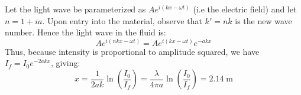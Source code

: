 \begin{solution}Let the light wave be parameterized as $Ae^{i(kx - \omega t)}$ (i.e the electric field) and let $n = 1 + ia$. Upon entry into the material, observe that $k' = nk$ is the new wave number. Hence the light wave in the fluid is:
$$Ae^{i(nkx - \omega t)} = Ae^{i(kx- \omega t)}e^{-akx}$$
Thus, because intensity is proportional to amplitude squared, we have $I_f = I_0 e^{-2akx}$, giving:
$$x = \frac{1}{2ak}\ln\left(\frac{I_0}{I_f}\right) = \frac{\lambda}{4\pi a}\ln\left(\frac{I_0}{I_f}\right) = \boxed{2.14\;\text{m}}$$
\end{solution}